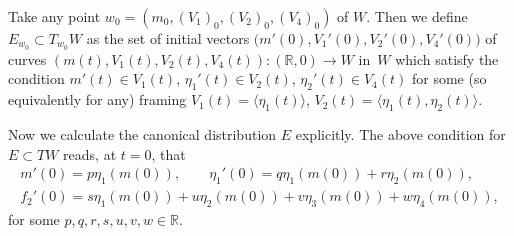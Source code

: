 \documentclass[11pt]{article}
\numberwithin{equation}{section}
\numberwithin{equation}{section}
\theoremstyle{definition}
\newcommand{\R}{\mathbb{R}}
\newcommand{\0}{\boldsymbol{0}}
\begin{document}
Take any point $w_0 = (m_0, (V_1)_0, (V_2)_0, (V_4)_0)$ of $W$. Then
we define $E_{w_0} \subset T_{w_0}W$ as the set of initial vectors
$
\bigl(m'(0), V_1'(0), V_2'(0), V_4'(0)\bigr)
$
of curves $(m(t), V_1(t), V_2(t), V_4(t)) \colon (\R, 0) \to W$ in~$W$ which satisfy the condition
$m'(t) \in V_1(t)$, $\eta_1'(t) \in V_2(t)$, $\eta_2'(t) \in V_4(t)$ for some (so equivalently for any) framing
$V_1(t) = \langle \eta_1(t)\rangle$, $V_2(t) = \langle \eta_1(t), \eta_2(t)\rangle$.

Now we calculate the canonical distribution $E$ explicitly.
The above condition for $E \subset TW$ reads, at $t = 0$, that
\begin{gather*}
m'(0) = p \eta_1(m(0)), \qquad \eta_1'(0) = q \eta_1(m(0)) + r \eta_2(m(0)),
\\
f_2'(0) = s \eta_1(m(0)) + u \eta_2(m(0)) + v \eta_3(m(0)) + w \eta_4(m(0)),
\end{gather*}
for some $p, q, r, s, u, v, w \in \R$.
\end{document}
